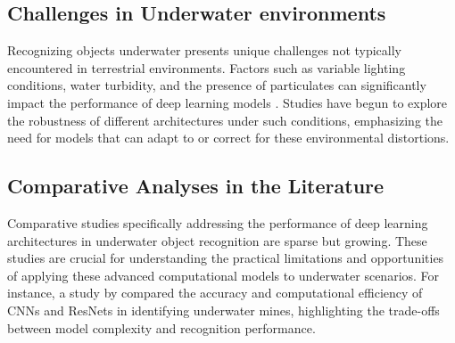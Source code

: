 \subsection{Challenges in Underwater environments}
Recognizing objects underwater presents unique challenges not typically
encountered in terrestrial environments.
Factors such as variable lighting conditions, water turbidity, and the
presence of particulates can significantly impact the performance of deep
learning models \parencite{liUnderwaterImageEnhancement2020e}.
Studies have begun to explore the robustness of different architectures under
such conditions, emphasizing the need for models that can adapt to or correct
for these environmental distortions.

\subsection{Comparative Analyses in the Literature}
Comparative studies specifically addressing the performance of deep learning
architectures in underwater object recognition are sparse but growing.
These studies are crucial for understanding the practical limitations and
opportunities of applying these advanced computational models to underwater
scenarios.
For instance, a study by \Textcite{tengUnderwaterTargetRecognition2020}
compared the accuracy and computational efficiency of CNNs
and ResNets in identifying underwater mines,
highlighting the trade-offs between model complexity and recognition
performance.

